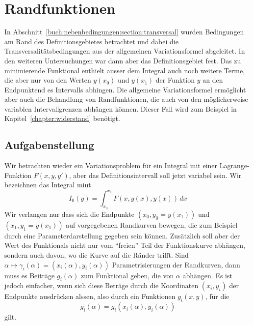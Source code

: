 %
%
%
\section{Randfunktionen
\label{buch:nebenbedingungen:section:randfunktionen}}
In Abschnitt~\ref{buch:nebenbedingungen:section:transversal} wurden
Bedingungen am Rand des Definitionsgebietes betrachtet und dabei
die Transversalitätsbedingungen aus der allgemeinen Variationsformel
abgeleitet.
In den weiteren Untersuchungen war dann aber das Definitionsgebiet
fest.
Das zu minimierende Funktional enthielt ausser dem Integral auch
noch weitere Terme, die aber nur von den Werten $y(x_0)$ und
$y(x_1)$ der Funktion $y$ an den Endpunktend es Intervalls
abhingen.
Die allgemeine Variationsformel ermöglicht aber auch die Behandlung
von Randfunktionen, die auch von den möglicherweise variablen
Intervallgrenzen abhängen können.
Dieser Fall wird zum Beispiel in Kapitel~\ref{chapter:widerstand}
benötigt.

%
%
\subsection{Aufgabenstellung
\label{buch:nebenbedingungen:randfunktionen:subsection:aufgabenstellung}}
Wir betrachten wieder ein Variationsproblem für ein Integral mit einer
Lagrange-Funktion $F(x,y,y')$, aber das Definitionsintervall soll
jetzt variabel sein.
Wir bezeichnen das Integral miut
\begin{equation*}
I_0(y)
=
\int_{x_0}^{x_1}
F(x,y(x),y(x))\,dx
\end{equation*}
Wir verlangen nur dass sich die Endpunkte $(x_0,y_0=y(x_1))$ und 
$(x_1,y_1=y(x_1))$ auf vorgegebenen Randkurven bewegen, die zum
Beispiel durch eine Parameterdarstellung gegeben sein können.
Zusätzlich soll aber der Wert des Funktionals nicht nur vom ``freien''
Teil der Funktionskurve abhängen, sondern auch davon, wo die Kurve auf
die Ränder trifft.
Sind $\alpha\mapsto \gamma_i(\alpha) = (x_i(\alpha),y_i(\alpha))$
Parametrisierungen der Randkurven, dann muss es Beiträge $g_i(\alpha)$
zum Funktional geben, die von $\alpha$ abhängen.
Es ist jedoch einfacher, wenn sich diese Beträge durch die Koordinaten
$(x_i,y_i)$ der Endpunkte ausdrücken alssen, also durch ein Funktionen
$g_i(x,y)$, für die
\[
g_i(\alpha) = g_i(x_i(\alpha), y_i(\alpha))
\]
gilt.

